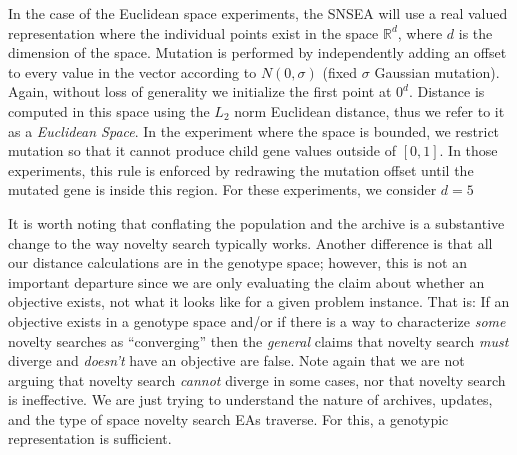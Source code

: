 \documentclass[twoside]{article}
\newcommand{\IR}{\mathbb{R}}
\begin{document}
In the case of the Euclidean space experiments, the SNSEA will use a real valued representation where the individual points exist in the space $\IR^d$, where $d$ is the dimension of the space.  Mutation is performed by independently adding an offset to every value in the vector according to $N(0,\sigma)$ (fixed $\sigma$ Gaussian mutation).  Again, without loss of generality we initialize the first point at $0^d$.  Distance is computed in this space using the $L_2$ norm Euclidean distance, thus we refer to it as a \emph{Euclidean Space}.  In the experiment where the space is bounded, we restrict mutation so that it cannot produce child gene values outside of $[0,1]$.  In those experiments, this rule is enforced by redrawing the mutation offset until the mutated gene is inside this region.  For these experiments, we consider $d=5$

It is worth noting that conflating the population and the archive is a substantive change to the way novelty search typically works.  Another difference is that all our distance calculations are in the genotype space; however, this is not an important departure since we are only evaluating the claim about whether an objective exists, not what it looks like for a given problem instance.  That is:  If an objective exists in a genotype space and/or if there is a way to characterize \emph{some} novelty searches as ``converging'' then the \emph{general} claims that novelty search \emph{must} diverge and \emph{doesn't} have an objective are false.  Note again that we are not arguing that novelty search \emph{cannot} diverge in some cases, nor that novelty search is ineffective.  We are just trying to understand the nature of archives, updates, and the type of space novelty search EAs traverse.  For this, a genotypic representation is sufficient.


\end{document}
